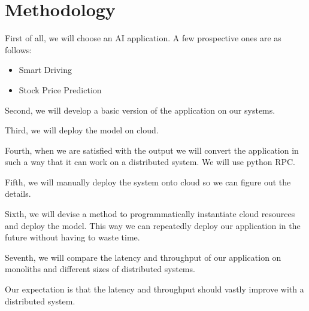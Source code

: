 \documentclass{article}
\begin{document}
\section{Methodology}
First of all, we will choose an AI application. A few prospective ones are as follows:
\begin{itemize}
  \item Smart Driving
  \item Stock Price Prediction
\end{itemize}

Second, we will develop a basic version of the application on our systems.

Third, we will deploy the model on cloud.

Fourth, when we are satisfied with the output we will convert the application in such a way that it can work on a distributed system. We will use python RPC.

Fifth, we will manually deploy the system onto cloud so we can figure out the details.

Sixth, we will devise a method to programmatically instantiate cloud resources and deploy the model. This way we can repeatedly deploy our application in the future without having to waste time.

Seventh, we will compare the latency and throughput of our application on monoliths and different sizes of distributed systems.

Our expectation is that the latency and throughput should vastly improve with a distributed system.
\end{document}
